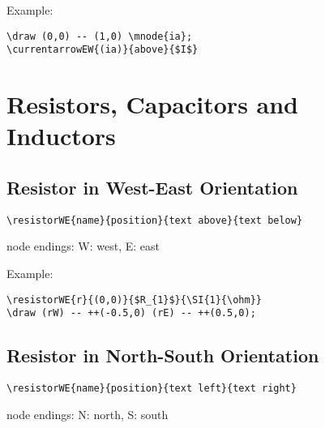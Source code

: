 \documentclass[parskip=full]{scrartcl}
\begin{document}
Example:\\
\begin{minipage}{0.8\textwidth}
\begin{verbatim}
\draw (0,0) -- (1,0) \mnode{ia};
\currentarrowEW{(ia)}{above}{$I$}
\end{verbatim}
\end{minipage}
\begin{minipage}{0.19\textwidth}
\end{minipage}

\section{Resistors, Capacitors and Inductors}

\subsection{Resistor in West-East Orientation}

\begin{verbatim}
\resistorWE{name}{position}{text above}{text below}
\end{verbatim}
node endings: W: west, E: east

Example:\\
\begin{minipage}{0.8\textwidth}
\begin{verbatim}
\resistorWE{r}{(0,0)}{$R_{1}$}{\SI{1}{\ohm}}
\draw (rW) -- ++(-0.5,0) (rE) -- ++(0.5,0);
\end{verbatim}
\end{minipage}
\begin{minipage}{0.19\textwidth}
\end{minipage}

\subsection{Resistor in North-South Orientation}

\begin{verbatim}
\resistorWE{name}{position}{text left}{text right}
\end{verbatim}
node endings: N: north, S: south
\end{document}

